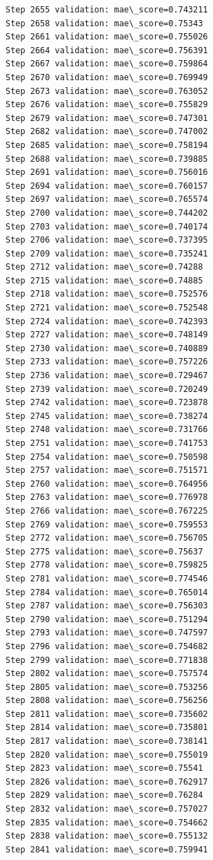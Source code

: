 \documentclass[11pt]{article}
\begin{document}
\begin{Verbatim}[commandchars=\\\{\}]
Step 2655 validation: mae\_score=0.743211
Step 2658 validation: mae\_score=0.75343
Step 2661 validation: mae\_score=0.755026
Step 2664 validation: mae\_score=0.756391
Step 2667 validation: mae\_score=0.759864
Step 2670 validation: mae\_score=0.769949
Step 2673 validation: mae\_score=0.763052
Step 2676 validation: mae\_score=0.755829
Step 2679 validation: mae\_score=0.747301
Step 2682 validation: mae\_score=0.747002
Step 2685 validation: mae\_score=0.758194
Step 2688 validation: mae\_score=0.739885
Step 2691 validation: mae\_score=0.756016
Step 2694 validation: mae\_score=0.760157
Step 2697 validation: mae\_score=0.765574
Step 2700 validation: mae\_score=0.744202
Step 2703 validation: mae\_score=0.740174
Step 2706 validation: mae\_score=0.737395
Step 2709 validation: mae\_score=0.735241
Step 2712 validation: mae\_score=0.74288
Step 2715 validation: mae\_score=0.74885
Step 2718 validation: mae\_score=0.752576
Step 2721 validation: mae\_score=0.752548
Step 2724 validation: mae\_score=0.742393
Step 2727 validation: mae\_score=0.748149
Step 2730 validation: mae\_score=0.740889
Step 2733 validation: mae\_score=0.757226
Step 2736 validation: mae\_score=0.729467
Step 2739 validation: mae\_score=0.720249
Step 2742 validation: mae\_score=0.723878
Step 2745 validation: mae\_score=0.738274
Step 2748 validation: mae\_score=0.731766
Step 2751 validation: mae\_score=0.741753
Step 2754 validation: mae\_score=0.750598
Step 2757 validation: mae\_score=0.751571
Step 2760 validation: mae\_score=0.764956
Step 2763 validation: mae\_score=0.776978
Step 2766 validation: mae\_score=0.767225
Step 2769 validation: mae\_score=0.759553
Step 2772 validation: mae\_score=0.756705
Step 2775 validation: mae\_score=0.75637
Step 2778 validation: mae\_score=0.759825
Step 2781 validation: mae\_score=0.774546
Step 2784 validation: mae\_score=0.765014
Step 2787 validation: mae\_score=0.756303
Step 2790 validation: mae\_score=0.751294
Step 2793 validation: mae\_score=0.747597
Step 2796 validation: mae\_score=0.754682
Step 2799 validation: mae\_score=0.771838
Step 2802 validation: mae\_score=0.757574
Step 2805 validation: mae\_score=0.753256
Step 2808 validation: mae\_score=0.756256
Step 2811 validation: mae\_score=0.735602
Step 2814 validation: mae\_score=0.735801
Step 2817 validation: mae\_score=0.738141
Step 2820 validation: mae\_score=0.755019
Step 2823 validation: mae\_score=0.75541
Step 2826 validation: mae\_score=0.762917
Step 2829 validation: mae\_score=0.76284
Step 2832 validation: mae\_score=0.757027
Step 2835 validation: mae\_score=0.754662
Step 2838 validation: mae\_score=0.755132
Step 2841 validation: mae\_score=0.759941

\end{Verbatim}
\end{document}
